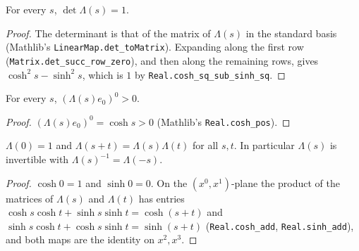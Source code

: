 \begin{lemma}
    \label{lmm:boost-matrix-proper}
    \leanok
    For every $s$, $\det \Lambda(s) = 1$.
\end{lemma}
\begin{proof}
    \leanok
    The determinant is that of the matrix of $\Lambda(s)$ in the standard basis (Mathlib's \texttt{LinearMap.det\_toMatrix}). Expanding along the first row (\texttt{Matrix.det\_succ\_row\_zero}), and then along the remaining rows, gives $\cosh^2 s - \sinh^2 s$, which is $1$ by \texttt{Real.cosh\_sq\_sub\_sinh\_sq}.
\end{proof}

\begin{lemma}
    \label{lmm:boost-matrix-orthochronous}
    \leanok
    For every $s$, $(\Lambda(s)e_0)^0 > 0$.
\end{lemma}
\begin{proof}
    \leanok
    $(\Lambda(s)e_0)^0 = \cosh s > 0$ (Mathlib's \texttt{Real.cosh\_pos}).
\end{proof}

\begin{lemma}
    \label{lmm:boost-matrix-group-law}
    \leanok
    $\Lambda(0) = 1$ and $\Lambda(s + t) = \Lambda(s)\Lambda(t)$ for all $s, t$. In particular $\Lambda(s)$ is invertible with $\Lambda(s)^{-1} = \Lambda(-s)$.
\end{lemma}
\begin{proof}
    \leanok
    $\cosh 0 = 1$ and $\sinh 0 = 0$. On the $(x^0, x^1)$-plane the product of the matrices of $\Lambda(s)$ and $\Lambda(t)$ has entries $\cosh s\cosh t + \sinh s\sinh t = \cosh(s+t)$ and $\sinh s\cosh t + \cosh s\sinh t = \sinh(s+t)$ (\texttt{Real.cosh\_add}, \texttt{Real.sinh\_add}), and both maps are the identity on $x^2, x^3$.
\end{proof}

